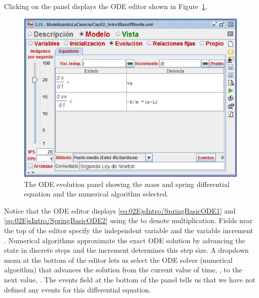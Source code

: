 Clicking on the  panel displays the ODE editor shown in
Figure~\ref{fig:02EjsIntro/ModelEvolution}.
\begin{figure}[htb]
    \centering
  \includegraphics[scale=\scale]{02EjsIntro/images/ModelEvolution.eps}
    \caption{The ODE evolution panel showing the mass and spring differential equation and the numerical algorithm selected.}
    \label{fig:02EjsIntro/ModelEvolution}
\end{figure}
Notice that the ODE editor displays \eqref{eq:02EjsIntro/SpringBasicODE1} and \eqref{eq:02EjsIntro/SpringBasicODE2}
using the  \lit{*} to denote multiplication. Fields near the top of the editor specify the
independent variable  and the variable increment .  Numerical algorithms approximate the exact ODE solution by advancing the state in discrete steps and the increment determines this step size. A dropdown menu at the bottom of the editor lets us select the ODE solver (numerical algorithm) that advances the solution from the current value of time, , to the next value, . The events field at the bottom of the panel tells us that we have
not defined any events for this differential equation.

